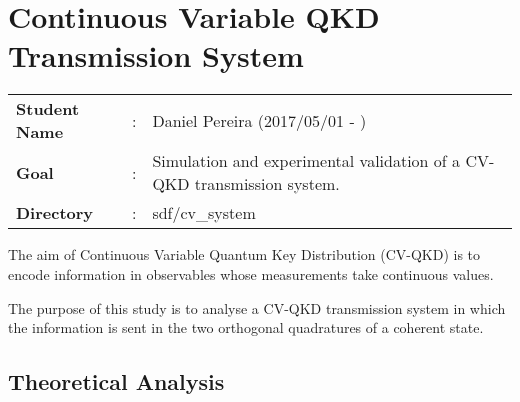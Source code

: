 \clearpage
\section{Continuous Variable QKD Transmission System}\label{sec:intro}

\begin{tcolorbox}	
\begin{tabular}{p{2.75cm} p{0.2cm} p{10.5cm}} 	
\textbf{Student Name}  &:& Daniel Pereira (2017/05/01 - )\\
\textbf{Goal}          &:& Simulation and experimental validation of a CV-QKD transmission system.\\
\textbf{Directory}              &:& sdf/cv\_system  
\end{tabular}
\end{tcolorbox}

The aim of Continuous Variable Quantum Key Distribution (CV-QKD) is to encode information in observables whose measurements take continuous values.
\par
The purpose of this study is to analyse a CV-QKD transmission system in which the information is sent in the two orthogonal quadratures of a coherent state. 

\subsection{Theoretical Analysis}

